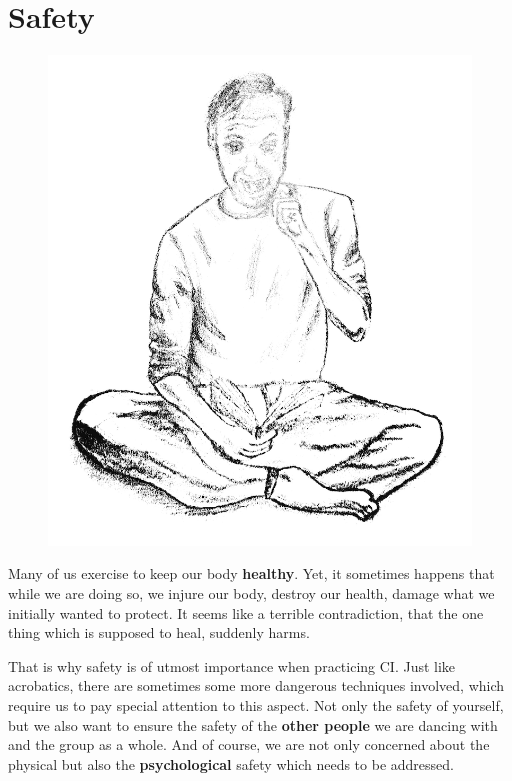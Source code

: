 \chapter{Safety}\label{ch:safety}

\begin{figure}[h]
    \begin{center}
    {\includegraphics[width=0.3\paperwidth]{images/testpic}}
    \end{center}\label{img:safety}
\end{figure}

Many of us exercise to keep our body \textbf{healthy}.
Yet, it sometimes happens that while we are doing so, we injure our body, destroy our health, damage what we initially wanted to protect.
It seems like a terrible contradiction, that the one thing which is supposed to heal, suddenly harms.

That is why safety is of utmost importance when practicing CI\@.
Just like acrobatics, there are sometimes some more dangerous techniques involved, which require us to pay special attention to this aspect.
Not only the safety of yourself, but we also want to ensure the safety of the \textbf{other people} we are dancing with and the group as a whole.
And of course, we are not only concerned about the physical but also the \textbf{psychological} safety which needs to be addressed.

